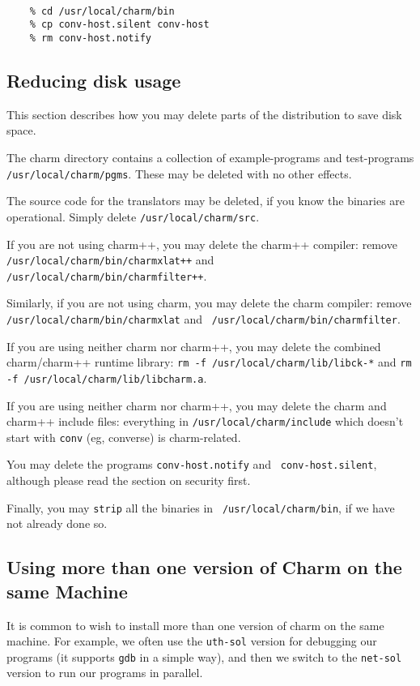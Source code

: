 \begin{verbatim}

    % cd /usr/local/charm/bin
    % cp conv-host.silent conv-host
    % rm conv-host.notify

\end{verbatim}

\subsection{Reducing disk usage}

This section describes how you may delete parts of the distribution to
save disk space.  

The charm directory contains a collection of example-programs and
test-programs {\tt /usr/local/charm/pgms}.  These may be deleted with
no other effects.

The source code for the translators may be deleted, if you know the
binaries are operational.  Simply delete {\tt /usr/local/charm/src}.

If you are not using charm++, you may delete the charm++ compiler:
remove {\tt /usr/local/charm/bin/charmxlat++} and {\tt
/usr/local/charm/bin/charmfilter++}.

Similarly, if you are not using charm, you may delete the charm compiler:
remove {\tt /usr/local/charm/bin/charmxlat} and {\tt
/usr/local/charm/bin/charmfilter}.

If you are using neither charm nor charm++, you may delete the
combined charm/charm++ runtime library: {\tt rm -f
/usr/local/charm/lib/libck-*} and {\tt rm -f
/usr/local/charm/lib/libcharm.a}.

If you are using neither charm nor charm++, you may delete the charm
and charm++ include files: everything in {\tt /usr/local/charm/include}
which doesn't start with {\tt conv} (eg, converse) is charm-related.

You may delete the programs {\tt conv-host.notify} and {\tt
conv-host.silent}, although please read the section on security first.

Finally, you may {\tt strip} all the binaries in {\tt
/usr/local/charm/bin}, if we have not already done so.

\subsection{Using more than one version of Charm on the same Machine}

It is common to wish to install more than one version of charm on the
same machine.  For example, we often use the {\tt uth-sol} version for
debugging our programs (it supports {\tt gdb} in a simple way), and
then we switch to the {\tt net-sol} version to run our programs in
parallel.

